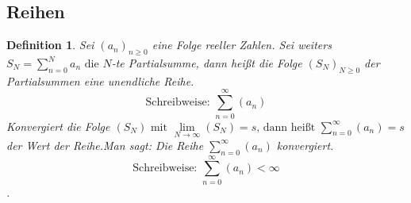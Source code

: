 \documentclass[a4paper,titlepage,oneside]{article}
\newcommand{\suminf}[2]{\ensuremath{\sum_{#1= 0}^{\infty}{\left(#2\right)}}}
\renewcommand{\liminf}[2]{\ensuremath{\lim\limits_{#1 \rightarrow \infty}{\left(#2\right)}}}
\theoremstyle{thmstyle}
\newtheorem{defi}[satz]{Definition}
\begin{document}
\subsection{Reihen}

\begin{defi}
Sei \((a_n)_{n \ge 0}\) eine Folge reeller Zahlen. Sei weiters \(S_N = \sum_{n = 0}^{N}{a_n} \text{ die }N\)-te Partialsumme, dann heißt die Folge \((S_N)_{N \ge 0}\) der Partialsummen eine unendliche Reihe.\\
\[\text{Schreibweise: }\suminf{n}{a_n}\]
Konvergiert die Folge \((S_N)\text{ mit }\liminf{N}{S_N} = s \text{, dann heißt } \suminf{n}{a_n} = s\) der Wert der Reihe.Man sagt: Die Reihe \(\suminf{n}{a_n}\) konvergiert.
\[\text{Schreibweise: } \suminf{n}{a_n} < \infty\].
\end{defi}
\end{document}
